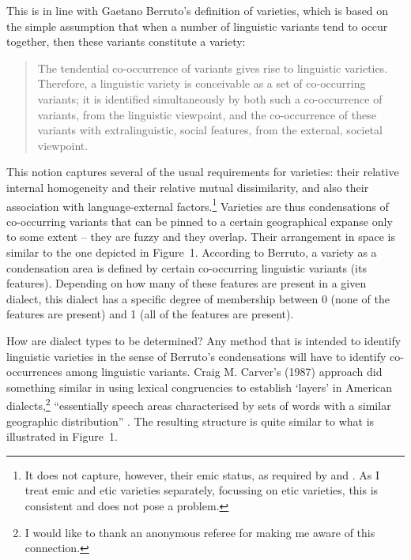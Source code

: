 \documentclass[output=paper]{LSP/langsci}
\begin{document}
This is in line with Gaetano Berruto’s definition of varieties, which is based on the simple assumption that when a number of linguistic variants tend to occur together, then these variants constitute a variety:

\begin{quote}
The tendential co-occurrence of variants gives rise to linguistic varieties. Therefore, a linguistic variety is conceivable as a set of co-occurring variants; it is identified simultaneously by both such a co-occurrence of variants, from the linguistic viewpoint, and the co-occurrence of these variants with extralinguistic, social features, from the external, societal viewpoint.\\
\citep[229]{auer_identifying_2010}
\end{quote}

This notion captures several of the usual requirements for varieties: their relative internal homogeneity and their relative mutual dissimilarity, and also their association with language-external factors.\footnote{   It does not capture, however, their emic status, as required by \citet[99]{auer_konversationelle_1986} and \citet[389--390]{lenz_struktur_2003}. As I treat emic and etic varieties separately, focussing on etic varieties, this is consistent and does not pose a problem.} Varieties are thus condensations of co-occurring variants that can be pinned to a certain geographical expanse only to some extent – they are fuzzy and they overlap. Their arrangement in space is similar to the one depicted in Figure~1. According to Berruto, a variety as a condensation area is defined by certain co-occurring linguistic variants (its features). Depending on how many of these features are present in a given dialect, this dialect has a specific degree of membership between 0 (none of the features are present) and 1 (all of the features are present).

How are dialect types to be determined? Any method that is intended to identify linguistic varieties in the sense of Berruto’s condensations will have to identify co-occurrences among linguistic variants. Craig M. Carver’s (1987) %
approach did something similar in using lexical congruencies to establish ‘layers’ in American dialects,\footnote{I would like to thank an anonymous referee for making me aware of this connection.} “essentially speech areas characterised by sets of words with a similar geographic distribution” \citep[24]{boberg_north_2005}. The resulting structure is quite similar to what is illustrated in Figure~1. 
\end{document}
